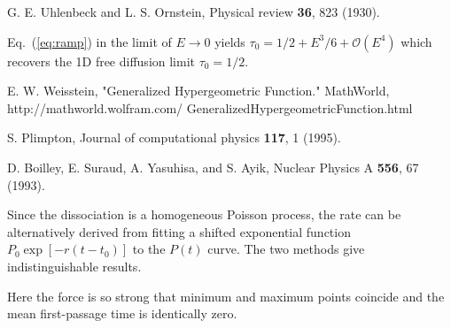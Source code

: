 \documentclass[twocolumn,pre,aps,showpacs,a4paper,floatfix,amssymb]{revtex4-1}
\newcommand{\refeq}[1]{Eq.~(\ref{#1})}
\newcommand{\MAi}[1]{#1} %
\begin{document}
\begin{thebibliography}{21}
G. E. Uhlenbeck and L. S. Ornstein, Physical review {\bf 36}, 823 (1930).

\MAi{\refeq{eq:ramp} in the limit of $E\rightarrow 0$ yields $\tau_0 = 1/2 + E^3/6 +\mathcal{O}(E^4)$ which recovers the 1D free diffusion limit $\tau_0=1/2$.}

E. W. Weisstein, "Generalized Hypergeometric Function." MathWorld, http://mathworld.wolfram.com/ GeneralizedHypergeometricFunction.html

S. Plimpton, Journal of computational physics {\bf 117}, 1 (1995).

D. Boilley, E. Suraud, A. Yasuhisa, and S. Ayik, Nuclear Physics A {\bf 556}, 67 (1993).


\MAi{Since the dissociation is a homogeneous Poisson process, the rate can be} alternatively derived from fitting a shifted exponential function $P_0 \exp[-r(t-t_0)]$ to the $P(t)$ curve. The two methods give indistinguishable results.



Here the force is so strong that minimum and maximum points coincide and the mean first-passage time is identically zero.





\end{thebibliography}
\end{document}
